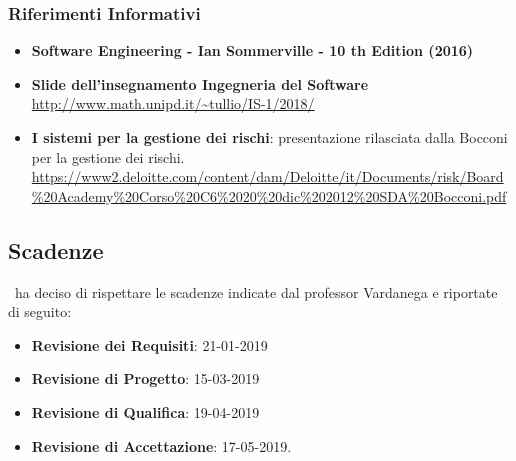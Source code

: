 		\subsubsection{Riferimenti Informativi}
			\begin{itemize}
				\item \textbf{Software Engineering - Ian Sommerville - 10 th Edition (2016)}
				\item \textbf{Slide dell’insegnamento Ingegneria del Software}\\
				\url{http://www.math.unipd.it/~tullio/IS-1/2018/}
				\item \textbf{I sistemi per la gestione dei rischi}: presentazione rilasciata dalla Bocconi per la gestione dei rischi.\\
				\url{https://www2.deloitte.com/content/dam/Deloitte/it/Documents/risk/Board\%20Academy\%20Corso\%20C6\%2020\%20dic\%202012\%20SDA\%20Bocconi.pdf}
			\end{itemize}
		
	\subsection{Scadenze}
	\gruppo\ ha deciso di rispettare le scadenze indicate dal professor Vardanega e riportate di seguito:
	\begin{itemize}
		\item \textbf{Revisione dei Requisiti}: 21-01-2019
		\item \textbf{Revisione di Progetto}: 15-03-2019
		\item \textbf{Revisione di Qualifica}: 19-04-2019
		\item \textbf{Revisione di Accettazione}: 17-05-2019.
	\end{itemize}
	
